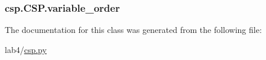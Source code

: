 \subsubsection[{variable\+\_\+order}]{\setlength{\rightskip}{0pt plus 5cm}csp.\+C\+S\+P.\+variable\+\_\+order}\label{classcsp_1_1_c_s_p_a25e138ab056f90e123b27985f341b96c}


The documentation for this class was generated from the following file\+:\begin{DoxyCompactItemize}
\item 
lab4/\hyperlink{csp_8py}{csp.\+py}\end{DoxyCompactItemize}
